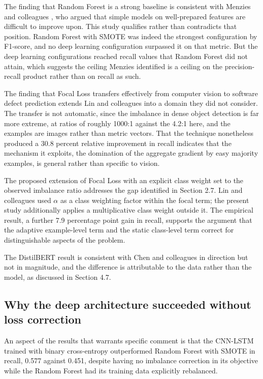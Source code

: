 \documentclass[12pt,a4paper,oneside]{report}
\begin{document}
The finding that Random Forest is a strong baseline is consistent with Menzies and colleagues \cite{menzies2010}, who argued that simple models on well-prepared features are difficult to improve upon. This study qualifies rather than contradicts that position. Random Forest with SMOTE was indeed the strongest configuration by F1-score, and no deep learning configuration surpassed it on that metric. But the deep learning configurations reached recall values that Random Forest did not attain, which suggests the ceiling Menzies identified is a ceiling on the precision-recall product rather than on recall as such.

The finding that Focal Loss transfers effectively from computer vision to software defect prediction extends Lin and colleagues \cite{lin2017} into a domain they did not consider. The transfer is not automatic, since the imbalance in dense object detection is far more extreme, at ratios of roughly 1000:1 against the 4.2:1 here, and the examples are images rather than metric vectors. That the technique nonetheless produced a 30.8 percent relative improvement in recall indicates that the mechanism it exploits, the domination of the aggregate gradient by easy majority examples, is general rather than specific to vision.

The proposed extension of Focal Loss with an explicit class weight set to the observed imbalance ratio addresses the gap identified in Section 2.7. Lin and colleagues used $\alpha$ as a class weighting factor within the focal term; the present study additionally applies a multiplicative class weight outside it. The empirical result, a further 7.9 percentage point gain in recall, supports the argument that the adaptive example-level term and the static class-level term correct for distinguishable aspects of the problem.

The DistilBERT result is consistent with Chen and colleagues \cite{chen2022} in direction but not in magnitude, and the difference is attributable to the data rather than the model, as discussed in Section 4.7.

\subsection{Why the deep architecture succeeded without loss correction}

An aspect of the results that warrants specific comment is that the CNN-LSTM trained with binary cross-entropy outperformed Random Forest with SMOTE in recall, 0.577 against 0.451, despite having no imbalance correction in its objective while the Random Forest had its training data explicitly rebalanced.
\end{document}
